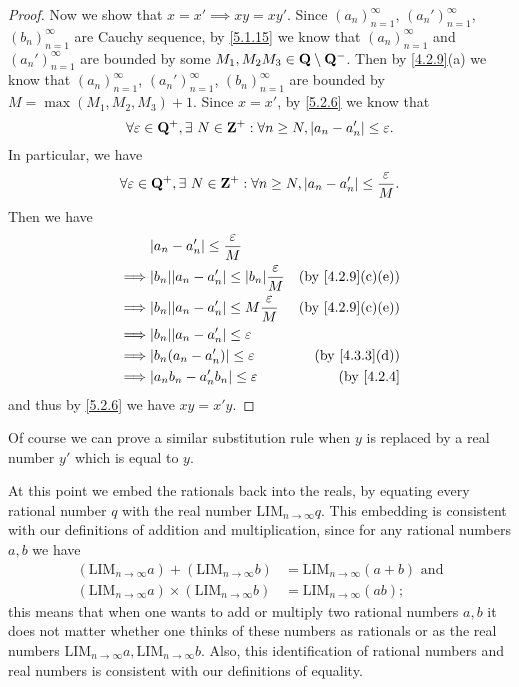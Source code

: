 \begin{proof}
  Now we show that \(x = x' \implies xy = xy'\).
  Since \((a_n)_{n = 1}^\infty\), \((a_n')_{n = 1}^\infty\), \((b_n)_{n = 1}^\infty\) are Cauchy sequence, by \cref{5.1.15} we know that \((a_n)_{n = 1}^\infty\) and \((a_n')_{n = 1}^\infty\) are bounded by some \(M_1, M_2 M_3 \in \mathbf{Q} \setminus \mathbf{Q}^-\).
  Then by \cref{4.2.9}(a) we know that \((a_n)_{n = 1}^\infty\), \((a_n')_{n = 1}^\infty\), \((b_n)_{n = 1}^\infty\) are bounded by \(M = \max(M_1, M_2, M_3) + 1\).
  Since \(x = x'\), by \cref{5.2.6} we know that
  \[
    \forall \varepsilon \in \mathbf{Q}^+, \exists\ N \in \mathbf{Z}^+ : \forall n \geq N, \left\lvert a_n - a_n'\right\rvert \leq \varepsilon.
  \]
  In particular, we have
  \[
    \forall \varepsilon \in \mathbf{Q}^+, \exists\ N \in \mathbf{Z}^+ : \forall n \geq N, \left\lvert a_n - a_n'\right\rvert \leq \frac{\varepsilon}{M}.
  \]
  Then we have
  \begin{align*}
             & \abs{a_n - a_n'} \leq \frac{\varepsilon}{M}                                                      \\
    \implies & \abs{b_n} \abs{a_n - a_n'} \leq \abs{b_n} \frac{\varepsilon}{M} & \text{(by \cref{4.2.9}(c)(e))} \\
    \implies & \abs{b_n} \abs{a_n - a_n'} \leq M \frac{\varepsilon}{M}         & \text{(by \cref{4.2.9}(c)(e))} \\
    \implies & \abs{b_n} \abs{a_n - a_n'} \leq \varepsilon                                                      \\
    \implies & \abs{b_n (a_n - a_n')} \leq \varepsilon                         & \text{(by \cref{4.3.3}(d))}    \\
    \implies & \abs{a_n b_n - a_n' b_n} \leq \varepsilon                       & \text{(by \cref{4.2.4}}
  \end{align*}
  and thus by \cref{5.2.6} we have \(xy = x'y\).
\end{proof}

\begin{note}
  Of course we can prove a similar substitution rule when \(y\) is replaced by a real number \(y'\) which is equal to \(y\).
\end{note}

\begin{note}
  At this point we embed the rationals back into the reals, by equating every rational number \(q\) with the real number \(\text{LIM}_{n \to \infty} q\).
  This embedding is consistent with our definitions of addition and multiplication, since for any rational numbers \(a, b\) we have
  \begin{align*}
    (\text{LIM}_{n \to \infty} a) + (\text{LIM}_{n \to \infty} b)      & = \text{LIM}_{n \to \infty} (a + b) \text{ and} \\
    (\text{LIM}_{n \to \infty} a) \times (\text{LIM}_{n \to \infty} b) & = \text{LIM}_{n \to \infty} (ab);
  \end{align*}
  this means that when one wants to add or multiply two rational numbers \(a, b\) it does not matter whether one thinks of these numbers as rationals or as the real numbers \(\text{LIM}_{n \to \infty} a, \text{LIM}_{n \to \infty} b\).
  Also, this identification of rational numbers and real numbers is consistent with our definitions of equality.
\end{note}

